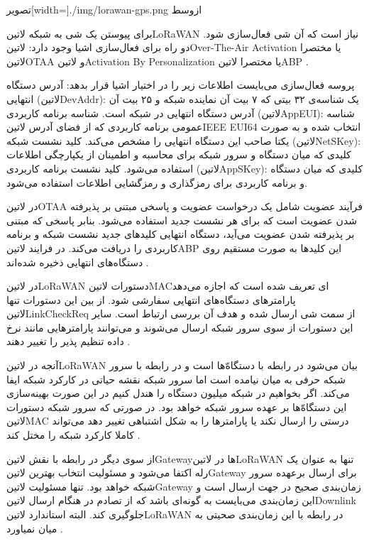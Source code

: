 ‌تصویر[width=\textwidth]{./img/lorawan-gps.png}
‌ازوسط

برای پیوستن یک شی به شبکه ‌لاتین{LoRaWAN} نیاز است که آن شی فعال‌سازی شود. دو راه برای فعال‌سازی اشیا وجود دارد: ‌لاتین{Over-The-Air Activation} یا مختصرا ‌لاتین{OTAA}
و ‌لاتین{Activation By Personalization} یا مختصرا ‌لاتین{ABP}
.

پروسه فعال‌سازی می‌بایست اطلاعات زیر را در اختیار اشیا قرار بدهد:
 آدرس دستگاه انتهایی (‌لاتین{DevAddr}): یک شناسه‌ی ۳۲ بیتی که ۷ بیت آن نماینده شبکه و ۲۵ بیت آن آدرس دستگاه انتهایی در شبکه است.
 شناسه برنامه کاربردی (‌لاتین{AppEUI}): شناسه عمومی برنامه کاربردی که از فضای آدرس ‌لاتین{IEEE EUI64} انتخاب شده و به صورت یکتا صاحب این دستگاه انتهایی را مشخص می‌کند.
 کلید نشست شبکه (‌لاتین{NetSKey}): کلیدی که میان دستگاه و سرور شبکه برای محاسبه و اطمینان از یکپارچگی اطلاعات استفاده می‌شود.
 کلید نشست برنامه کاربردی (‌لاتین{AppSKey}): کلیدی که میان دستگاه و برنامه کاربردی برای رمزگذاری و رمزگشایی اطلاعات استفاده می‌شود.

در ‌لاتین{OTAA} فرآیند عضویت شامل یک درخواست عضویت و پاسخی مبتنی بر پذیرفته شدن عضویت است که برای هر نشست جدید استفاده می‌شود.
بنابر پاسخی که مبتنی بر پذیرفته شدن عضویت می‌آید، دستگاه انتهایی کلیدهای جدید نشست شبکه و برنامه کاربردی را دریافت می‌کند.
در فرایند ‌لاتین{ABP} این کلیدها به صورت مستقیم روی دستگاه‌های انتهایی ذخیره شده‌اند
.

در ‌لاتین{LoRaWAN} دستورات ‌لاتین{MAC}ای تعریف شده است که اجازه می‌دهد پارامترهای دستگاه‌های انتهایی سفارشی شود.
از بین این دستورات تنها ‌لاتین{LinkCheckReq} از سمت شی ارسال شده و هدف آن بررسی ارتباط است.
سایر این دستورات از سوی سرور شبکه ارسال می‌شوند و می‌توانند پارامترهایی مانند نرخ داده تنظیم پذیر را تغییر دهند
.

آنجه در ‌لاتین{LoRaWAN} بیان می‌شود در رابطه با دستگاه‌ّها است و در رابطه با سرور شبکه حرفی به میان نیامده است اما سرور شبکه نقشه حیاتی در کارکرد شبکه ایفا می‌کند.
اگر بخواهیم در شبکه میلیون دستگاه را هندل کنیم در این صورت بهینه‌سازی این دستگاه‌ّها بر عهده سرور شبکه خواهد بود. در صورتی که سرور شبکه دستورات ‌لاتین{MAC}
درستی را ارسال نکند یا پارامترها را به شکل اشتباهی تغییر دهد می‌تواند کاملا کارکرد شبکه را مختل کند
.

از سوی دیگر در رابطه با نقش ‌لاتین{Gateway}ها در ‌لاتین{LoRaWAN} تنها به عنوان یک رله اکتفا می‌شود و مسئولیت انتخاب بهترین ‌لاتین{Gateway} برای ارسال
برعهده سرور شبکه خواهد بود. تنها مسئولیت ‌لاتین{Gateway} زمان‌بندی صحیح در جهت ارسال است و این زمان‌بندی می‌بایست به گونه‌ای باشد که از تصادم در هنگام ارسال
‌لاتین{Downlink} جلوگیری کند. البته استاندارد ‌لاتین{LoRaWAN} در رابطه با این زمان‌بندی صحیتی به میان نمیاورد
.

